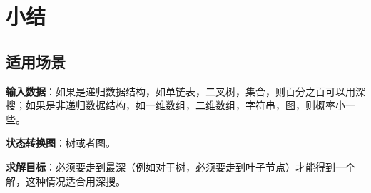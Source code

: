 \section{小结} %
\label{sec:dfs-template}


\subsection{适用场景}

\textbf{输入数据}：如果是递归数据结构，如单链表，二叉树，集合，则百分之百可以用深搜；如果是非递归数据结构，如一维数组，二维数组，字符串，图，则概率小一些。

\textbf{状态转换图}：树或者图。

\textbf{求解目标}：必须要走到最深（例如对于树，必须要走到叶子节点）才能得到一个解，这种情况适合用深搜。



